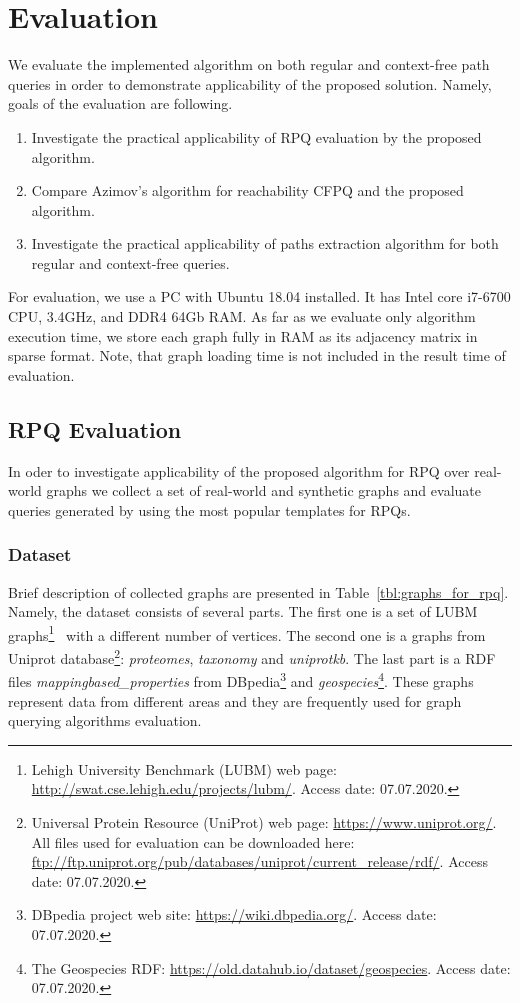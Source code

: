 \section{Evaluation}

We evaluate the implemented algorithm on both regular and context-free path queries in order to demonstrate applicability of the proposed solution.
Namely, goals of the evaluation are following.
\begin{enumerate}
	\item Investigate the practical applicability of RPQ evaluation by the proposed algorithm.
	\item Compare Azimov's algorithm for reachability CFPQ and the proposed algorithm.
	\item Investigate the practical applicability of paths extraction algorithm for both regular and context-free queries.
\end{enumerate}

For evaluation, we use a PC with Ubuntu 18.04 installed.
It has Intel core i7-6700 CPU, 3.4GHz, and DDR4 64Gb RAM.
As far as we evaluate only algorithm execution time, we store each graph fully in RAM as its adjacency matrix in sparse format.
Note, that graph loading time is not included in the result time of evaluation.	

\subsection{RPQ Evaluation}

In oder to investigate applicability of the proposed algorithm for RPQ over real-world graphs we collect a set of real-world and synthetic graphs and evaluate queries generated by using the most popular templates for RPQs.

\subsubsection{Dataset}

Brief description of collected graphs are presented in Table~\ref{tbl:graphs_for_rpq}.
Namely, the dataset consists of several parts.
The first one is a set of LUBM graphs\footnote{Lehigh University Benchmark (LUBM) web page: \url{http://swat.cse.lehigh.edu/projects/lubm/}. Access date: 07.07.2020.}~\cite{10.1016/j.websem.2005.06.005} with a different number of vertices.
The second one is a graphs from Uniprot database\footnote{Universal Protein Resource (UniProt) web page: \url{https://www.uniprot.org/}. All files used for evaluation can be downloaded here: \url{ftp://ftp.uniprot.org/pub/databases/uniprot/current_release/rdf/}. Access date: 07.07.2020.}: \textit{proteomes}, \textit{taxonomy} and \textit{uniprotkb}.
The last part is a RDF files \textit{mappingbased\_properties} from DBpedia\footnote{DBpedia project web site: \url{https://wiki.dbpedia.org/}. Access date: 07.07.2020.} and \textit{geospecies}\footnote{The Geospecies RDF: \url{https://old.datahub.io/dataset/geospecies}. Access date: 07.07.2020.}.
These graphs represent data from different areas and they are frequently used for graph querying algorithms evaluation.

